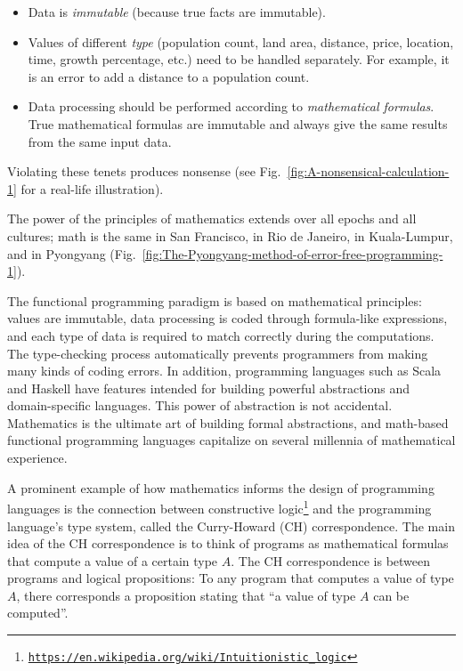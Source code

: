 \begin{itemize}
\item Data is \emph{immutable} (because true facts are immutable).
\item Values of different \emph{type} (population count, land area, distance,
price, location, time, growth percentage, etc.) need to be handled
separately. For example, it is an error to add a distance to a population
count.
\item Data processing should be performed according to \emph{mathematical
formulas}. True mathematical formulas are immutable and always give
the same results from the same input data.
\end{itemize}
Violating these tenets produces nonsense (see Fig.\ \ref{fig:A-nonsensical-calculation-1}
for a real-life illustration).

The power of the principles of mathematics extends over all epochs
and all cultures; math is the same in San Francisco, in Rio de Janeiro,
in Kuala-Lumpur, and in Pyongyang (Fig.\ \ref{fig:The-Pyongyang-method-of-error-free-programming-1}).


The functional programming paradigm is based on mathematical principles:
values are immutable, data processing is coded through formula-like
expressions, and each type of data is required to match correctly
during the computations. The type-checking process automatically prevents
programmers from making many kinds of coding errors. In addition,
programming languages such as Scala and Haskell have features intended
for building powerful abstractions and domain-specific languages.
This power of abstraction is not accidental. Mathematics is the ultimate
art of building formal abstractions, and math-based functional programming
languages capitalize on several millennia of mathematical experience.

A prominent example of how mathematics informs the design of programming
languages is the connection between constructive logic\footnote{\texttt{\href{https://en.wikipedia.org/wiki/Intuitionistic_logic}{https://en.wikipedia.org/wiki/Intuitionistic\_logic}}}
and the programming language\textsf{'}s type system, called the Curry-Howard
(CH) correspondence. The main idea of the CH correspondence
is to think of programs as mathematical formulas that compute a value
of a certain type $A$. The CH correspondence is between programs
and logical propositions: To any program that computes a value of
type $A$, there corresponds a proposition stating that \textsf{``}a value
of type $A$ can be computed\textsf{''}.


